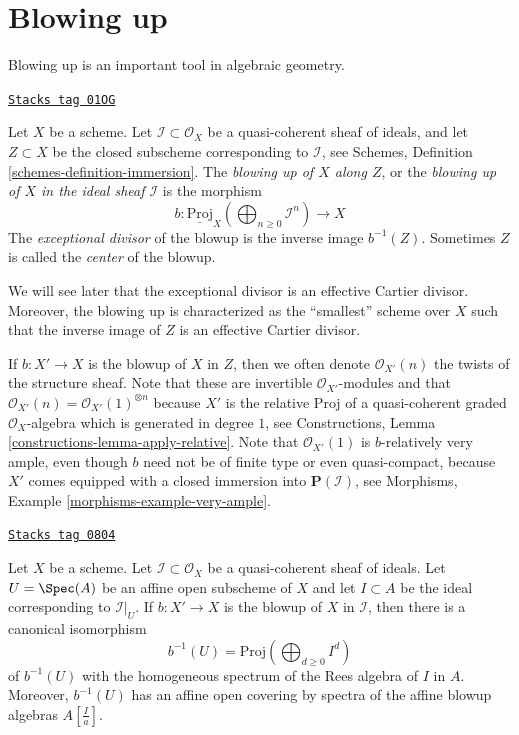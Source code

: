 \section{Blowing up}
\label{divisors-section-blowing-up}
Blowing up is an important tool in algebraic geometry.

\begin{definition}[Blow up]
\label{divisors-definition-blow-up}
\href{https://stacks.math.columbia.edu/tag/01OG}{\texttt{Stacks tag 01OG}}

Let $X$ be a scheme. Let $\mathcal{I} \subset \mathcal{O}_X$ be a
quasi-coherent sheaf of ideals, and let $Z \subset X$ be the closed subscheme
corresponding to $\mathcal{I}$, see
Schemes, Definition \ref{schemes-definition-immersion}.
The {\it blowing up of $X$ along $Z$}, or the
{\it blowing up of $X$ in the ideal sheaf $\mathcal{I}$} is
the morphism
$$
b :
\underline{\text{Proj}}_X
\left(\bigoplus\nolimits_{n \geq 0} \mathcal{I}^n\right)
\longrightarrow
X
$$
The {\it exceptional divisor} of the blowup is the inverse image
$b^{-1}(Z)$. Sometimes $Z$ is called the {\it center} of the blowup.
\end{definition}

We will see later that the exceptional divisor is an effective Cartier
divisor. Moreover, the blowing up is characterized as the ``smallest'' scheme
over $X$ such that the inverse image of $Z$ is an effective Cartier divisor.

\medskip\noindent
If $b : X' \to X$ is the blowup of $X$ in $Z$, then we often denote
$\mathcal{O}_{X'}(n)$ the twists of the structure sheaf. Note that these
are invertible $\mathcal{O}_{X'}$-modules and that
$\mathcal{O}_{X'}(n) = \mathcal{O}_{X'}(1)^{\otimes n}$
because $X'$ is the relative Proj of a quasi-coherent graded
$\mathcal{O}_X$-algebra which is generated in degree $1$, see
Constructions, Lemma \ref{constructions-lemma-apply-relative}.
Note that $\mathcal{O}_{X'}(1)$ is $b$-relatively very ample, even though
$b$ need not be of finite type or even quasi-compact, because
$X'$ comes equipped with a closed immersion into $\mathbf{P}(\mathcal{I})$,
see Morphisms, Example \ref{morphisms-example-very-ample}.

\begin{lemma}
\label{divisors-lemma-blowing-up-affine}
\href{https://stacks.math.columbia.edu/tag/0804}{\texttt{Stacks tag 0804}}

Let $X$ be a scheme. Let $\mathcal{I} \subset \mathcal{O}_X$ be a
quasi-coherent sheaf of ideals. Let $U = \Spec(A)$ be an affine open
subscheme of $X$ and let $I \subset A$ be the ideal corresponding to
$\mathcal{I}|_U$. If $b : X' \to X$ is the blowup of $X$ in $\mathcal{I}$,
then there is a canonical isomorphism
$$
b^{-1}(U) = \text{Proj}(\bigoplus\nolimits_{d \geq 0} I^d)
$$
of $b^{-1}(U)$ with the homogeneous spectrum of the Rees algebra
of $I$ in $A$. Moreover, $b^{-1}(U)$ has an affine open covering by
spectra of the affine blowup algebras $A[\frac{I}{a}]$.
\end{lemma}


